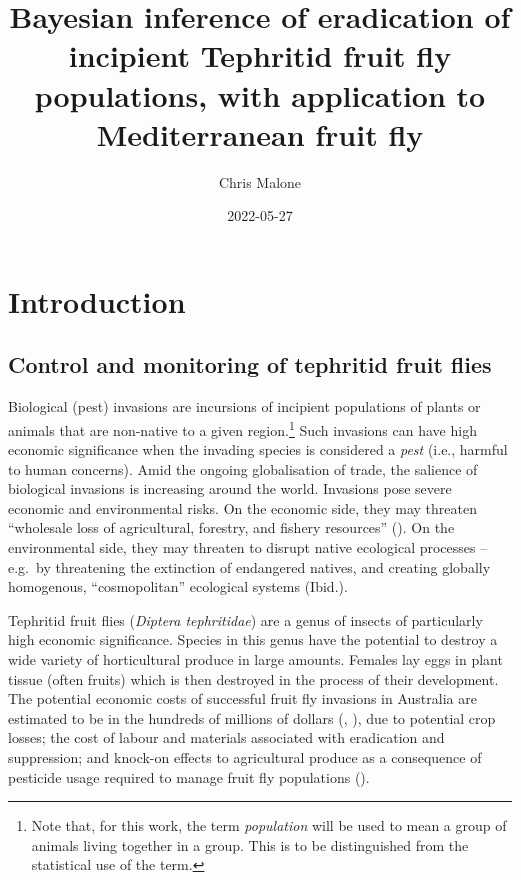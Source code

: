 \documentclass[
  oneside]{book}
\title{Bayesian inference of eradication of incipient Tephritid fruit fly populations, with application to Mediterranean fruit fly}
\author{Chris Malone}
\date{2022-05-27}
\begin{document}
\maketitle

\renewcommand{\baselinestretch}{1}\normalsize
\tableofcontents
\renewcommand{\baselinestretch}{2}\normalsize

\hypertarget{introduction}{%
\chapter{Introduction}\label{introduction}}

\hypertarget{control-and-monitoring-of-tephritid-fruit-flies}{%
\section{Control and monitoring of tephritid fruit flies}\label{control-and-monitoring-of-tephritid-fruit-flies}}

Biological (pest) invasions are incursions of incipient populations of plants or animals that are non-native to a given region.\footnote{Note that, for this work, the term \emph{population} will be used to mean a group of animals living together in a group. This is to be distinguished from the statistical use of the term.} Such invasions can have high economic significance when the invading species is considered a \emph{pest} (i.e., harmful to human concerns). Amid the ongoing globalisation of trade, the salience of biological invasions is increasing around the world. Invasions pose severe economic and environmental risks. On the economic side, they may threaten ``wholesale loss of agricultural, forestry, and fishery resources'' (\citet{mack2000}). On the environmental side, they may threaten to disrupt native ecological processes -- e.g.~by threatening the extinction of endangered natives, and creating globally homogenous, ``cosmopolitan'' ecological systems (Ibid.).

Tephritid fruit flies (\emph{Diptera tephritidae}) are a genus of insects of particularly high economic significance. Species in this genus have the potential to destroy a wide variety of horticultural produce in large amounts. Females lay eggs in plant tissue (often fruits) which is then destroyed in the process of their development. The potential economic costs of successful fruit fly invasions in Australia are estimated to be in the hundreds of millions of dollars (\citet{suckling2016}, \citet{hancock2000}), due to potential crop losses; the cost of labour and materials associated with eradication and suppression; and knock-on effects to agricultural produce as a consequence of pesticide usage required to manage fruit fly populations (\citet{suckling2016}).
\end{document}

